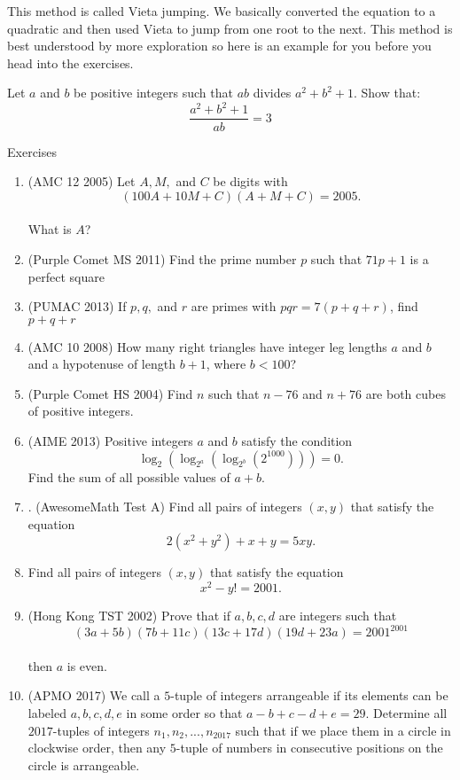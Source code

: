 This method is called Vieta jumping. We basically converted the equation to a quadratic and then used Vieta to jump from one root to the next. This method is best understood by more exploration so here is an example for you before you head into the exercises.\\
\begin{example}
    Let $a$ and $b$ be positive integers such that $ab$ divides $a^2 + b^2 + 1$. Show that:\\
    \[\frac{a^2 + b^2 + 1}{ab} = 3\]
\end{example}
\begin{xcb}{Exercises}
\begin{enumerate}
\item (AMC 12 2005) Let $A, M,$ and $C$ be digits with\\
\[(100A + 10M + C)(A + M + C) = 2005.\]\\
What is $A$?
\item (Purple Comet MS 2011)  Find the prime number $p$ such that $71p + 1$ is a perfect square
\item (PUMAC 2013) If $p, q,$ and $r$ are primes with $pqr = 7(p + q + r)$, find $p + q + r$
\item (AMC 10 2008) How many right triangles have integer leg lengths $a$ and $b$ and a hypotenuse of length $b + 1$, where $b < 100$?
\item  (Purple Comet HS 2004) Find $n$ such that $n - 76$ and $n + 76$ are both cubes of positive integers.
\item (AIME 2013) Positive integers $a$ and $b$ satisfy the condition\[\log_2(\log_{2^a}(\log_{2^b}(2^{1000}))) = 0.\]Find the sum of all possible values of $a+b$.
\item . (AwesomeMath Test A) Find all pairs of integers $(x, y)$ that satisfy the equation 
\[2(x^2 + y^2) + x + y = 5xy.\]
\item Find all pairs of integers $(x, y)$ that satisfy the equation\\
\[x^2 - y! = 2001.\]
\item (Hong Kong TST 2002) Prove that if $a, b, c, d$ are integers such that\\
\[(3a + 5b)(7b + 11c)(13c + 17d)(19d + 23a) = 2001^{2001}\]\\
then $a$ is even.
\item (APMO 2017) 	We call a $5$-tuple of integers arrangeable if its elements can be labeled $a, b, c, d, e$ in some order so that $a-b+c-d+e=29$. Determine all $2017$-tuples of integers $n_1, n_2, . . . , n_{2017}$ such that if we place them in a circle in clockwise order, then any $5$-tuple of numbers in consecutive positions on the circle is arrangeable.

\end{enumerate}
\end{xcb}
